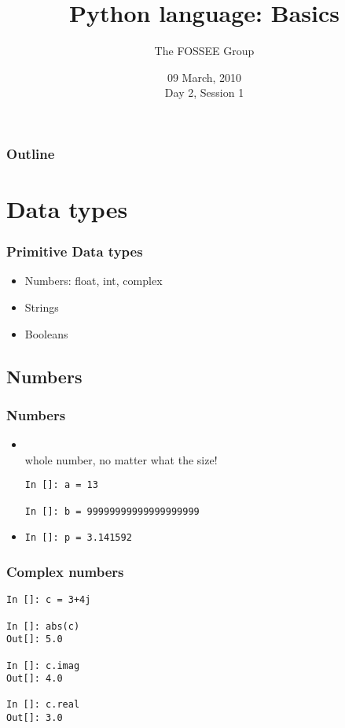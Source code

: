 \documentclass[14pt,compress]{beamer}
\title[Basic Python]{Python language: Basics}
\author[FOSSEE Team] {The FOSSEE Group}
\institute[IIT Bombay] {Department of Aerospace Engineering\\IIT Bombay}
\date[] {09 March, 2010\\Day 2, Session 1}
\newcommand{\kwrd}[1]{ \texttt{\textbf{\color{blue}{#1}}}  }
\begin{document}
\begin{frame}
  \titlepage
\end{frame}

\begin{frame}
  \frametitle{Outline}
  \tableofcontents
\end{frame}

\section{Data types}

\begin{frame}
  \frametitle{Primitive Data types}
  \begin{itemize}
    \item Numbers: float, int, complex
    \item Strings
    \item Booleans
  \end{itemize}
\end{frame}

\subsection{Numbers}
\begin{frame}[fragile]
  \frametitle{Numbers}
  \begin{itemize}
    \item \kwrd{int}\\ whole number, no matter what the size!
  \begin{lstlisting}
In []: a = 13

In []: b = 99999999999999999999
  \end{lstlisting}
    \item \kwrd{float}
  \begin{lstlisting}
In []: p = 3.141592
  \end{lstlisting}
  \end{itemize}
\end{frame}

\begin{frame}[fragile]
\frametitle{Complex numbers}
  \begin{lstlisting}
In []: c = 3+4j

In []: abs(c)
Out[]: 5.0

In []: c.imag
Out[]: 4.0

In []: c.real
Out[]: 3.0
  \end{lstlisting}
\end{frame}
\end{document}
